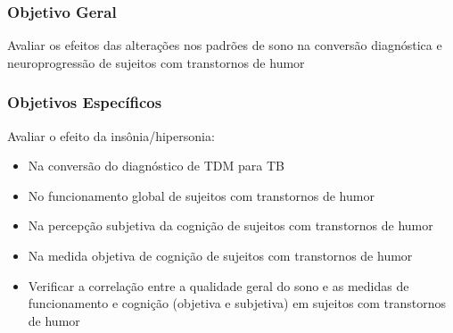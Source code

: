 \documentclass{beamer}
\begin{document}
\begin{frame}
    \frametitle{Objetivo Geral}

    \centering
    \Large
    Avaliar os efeitos das alterações nos padrões de sono na conversão
    diagnóstica e neuroprogressão de sujeitos com transtornos de humor

    \end{frame}

\begin{frame}
    \frametitle{Objetivos Específicos}

    \begin{block}{Avaliar o efeito da insônia/hipersonia:}

        \begin{itemize}

            \item Na conversão do diagnóstico de TDM para TB
            \item No funcionamento global de sujeitos com transtornos de humor
            \item Na percepção subjetiva da cognição de sujeitos com transtornos de humor
            \item Na medida objetiva de cognição de sujeitos com transtornos de humor

        \end{itemize}

    \end{block}

    \begin{block}
            
        \begin{itemize}

        \item Verificar a correlação entre a qualidade geral do sono e as medidas
        de funcionamento e cognição (objetiva e subjetiva) em sujeitos com transtornos
        de humor

        \end{itemize}

    \end{block}
    
\end{frame}
\end{document}
